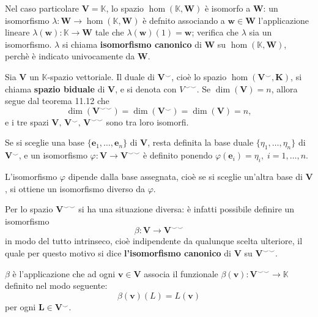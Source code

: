 \documentclass{article}
\theoremstyle{plain}
\theoremstyle{definition}
\theoremstyle{remark}
\begin{document}
\vspace{10pt}

Nel caso particolare $\mathbf{V}=\mathbb{K}$, lo spazio $\hom(\mathbb{K},\mathbf{W})$ è isomorfo a $\mathbf{W}$: un isomorfismo $\lambda :\mathbf{W}\to\hom(\mathbb{K},\mathbf{W})$ è defnito associando a $\mathbf{w}\in\mathbf{W}$ 
l'applicazione lineare $\lambda(\mathbf{w}):\mathbb{K}\to\mathbf{W}$ tale che $\lambda(\mathbf{w})(1)=\mathbf{w}$; verifica che $\lambda$ sia un isomorfismo. $\lambda$ si chiama \textbf{isomorfismo canonico} di $\mathbf{W}$ su $\hom(\mathbb{K},\mathbf{W})$, perchè è indicato univocamente da $\mathbf{W}$.

\vspace{10pt}

Sia $\mathbf{V}$ un $\mathbb{K}$-spazio vettoriale. Il duale di $\mathbf{V}^{\smallsmile}$, cioè lo spazio $\hom(\mathbf{V}^{\smallsmile}, \mathbf{K})$, si chiama \textbf{spazio biduale} di $\mathbf{V}$, e si denota con $V^{\smallsmile\smallsmile}$. 
Se $\dim(\mathbf{V}) = n$, allora segue dal teorema 11.12 che
\[
\dim(\mathbf{V}^{\smallsmile\smallsmile}) = \dim(\mathbf{V}^{\smallsmile}) = \dim(\mathbf{V}) = n,
\]
e i tre spazi $\mathbf{V},\,\mathbf{V}^{\smallsmile},\,\mathbf{V}^{\smallsmile\smallsmile}$ sono tra loro isomorfi.

Se si sceglie una base $\{\mathbf{e}_1, \dots, \mathbf{e}_n\}$ di $\mathbf{V}$, resta definita la base duale $\{\eta_1, \dots, \eta_n\}$ di $\mathbf{V}^{\smallsmile}$, e 
un isomorfismo $\varphi : \mathbf{V} \to \mathbf{V}^{\smallsmile\smallsmile}$ è definito ponendo $\varphi(\mathbf{e}_i) = \eta_i,\;i = 1, \dots, n$.

L'isomorfismo $\varphi$ dipende dalla base assegnata, cioè se si sceglie un'altra base di $\mathbf{V}$, si ottiene un isomorfismo diverso da $\varphi$.

Per lo spazio $\mathbf{V}^{\smallsmile\smallsmile}$ si ha una situazione diversa: è infatti possibile definire un isomorfismo
\[
\beta : \mathbf{V} \to \mathbf{V}^{\smallsmile\smallsmile}
\]
in modo del tutto intrinseco, cioè indipendente da qualunque scelta ulteriore, il quale per questo motivo si dice \textbf{l'isomorfismo canonico} di $\mathbf{V}$ su $\mathbf{V}^{\smallsmile\smallsmile}$.

$\beta$ è l'applicazione che ad ogni $\mathbf{v} \in \mathbf{V}$ associa il funzionale 
$\beta(\mathbf{v}) : \mathbf{V}^{\smallsmile\smallsmile} \to \mathbb{K}$ definito nel modo seguente:
\[
\beta(\mathbf{v})(L) = L(\mathbf{v})
\]
per ogni $\mathbf{L} \in \mathbf{V}^{\smallsmile}$.
\end{document}
